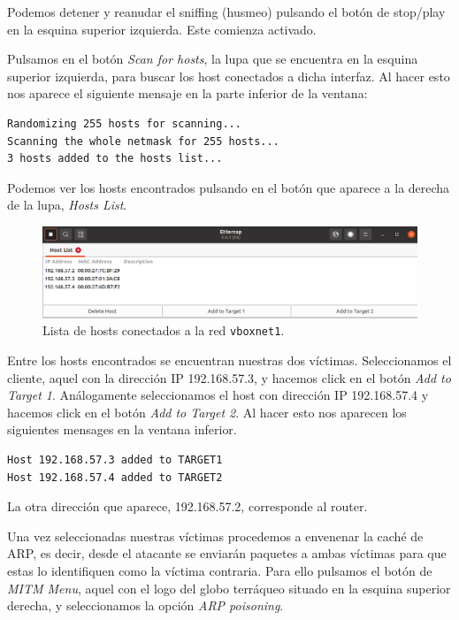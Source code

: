 \documentclass[11pt]{article}
\begin{document}
Podemos detener y reanudar el sniffing (husmeo) pulsando el botón de stop/play en la esquina
 superior izquierda. Este comienza activado.
 
Pulsamos en el botón \textit{Scan for hosts}, la lupa que se encuentra en la esquina superior izquierda, para buscar los host conectados a dicha interfaz. Al hacer esto nos aparece el siguiente mensaje en la parte inferior de la ventana:

\begin{Verbatim}[tabsize=4]
Randomizing 255 hosts for scanning...
Scanning the whole netmask for 255 hosts...
3 hosts added to the hosts list...
\end{Verbatim}

Podemos ver los hosts encontrados pulsando en el botón que aparece a la derecha de la lupa, \textit{Hosts List}.

\begin{figure}[H]
	\centering
	\includegraphics[width=140mm]{images/host-list}
	\caption{Lista de hosts conectados a la red \texttt{vboxnet1}.}
	\label{fig:host-list}
\end{figure}


Entre los hosts encontrados se encuentran nuestras dos víctimas. Seleccionamos el cliente, aquel con la dirección IP 192.168.57.3, y hacemos click en el botón \textit{Add to Target 1}. Análogamente seleccionamos el host con dirección IP 192.168.57.4 y hacemos click en el botón \textit{Add to Target 2}. Al hacer esto nos aparecen los siguientes mensages en la ventana inferior.

\begin{Verbatim}
Host 192.168.57.3 added to TARGET1
Host 192.168.57.4 added to TARGET2
\end{Verbatim}

La otra dirección que aparece, 192.168.57.2, corresponde al router.

Una vez seleccionadas nuestras víctimas procedemos a envenenar la caché de ARP, es decir, desde el atacante se enviarán paquetes a ambas víctimas para que estas lo identifiquen como la víctima contraria. Para ello pulsamos el botón de \textit{MITM Menu}, aquel con el logo del globo terráqueo situado en la esquina superior derecha, y seleccionamos la opción \textit{ARP poisoning}. 
\end{document}
